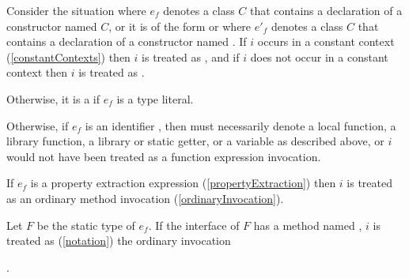 \documentclass[makeidx]{article}
\begin{document}
{\LMHash{}%
Consider the situation where $e_f$ denotes a class $C$
that contains a declaration of a constructor named $C$,
or it is of the form 
or  where
$e'_f$ denotes a class $C$ that contains a declaration of
a constructor named .
If $i$ occurs in a constant context
(\ref{constantContexts})
then $i$ is treated as ,
and if $i$ does not occur in a constant context
then $i$ is treated as .


\LMHash{}%
Otherwise, it is a  if $e_f$ is a type literal.


\LMHash{}%
Otherwise, if $e_f$ is an identifier \id, then \id{} must necessarily denote
a local function, a library function, a library or static getter,
or a variable as described above,
or $i$ would not have been treated as a function expression invocation.

\LMHash{}%
If $e_f$ is a property extraction expression
(\ref{propertyExtraction})
then $i$ is treated as an ordinary method invocation
(\ref{ordinaryInvocation}).


\LMHash{}%
Let $F$ be the static type of $e_f$.
If the interface of $F$ has a method named \CALL,
$i$ is treated as
(\ref{notation})
the ordinary invocation

\noindent
{}.

}
\end{document}
